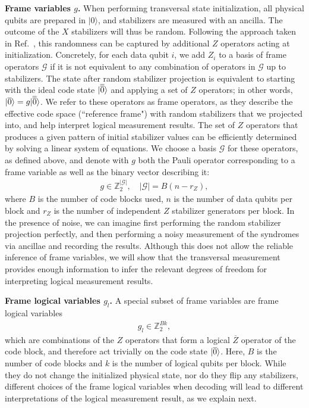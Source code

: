\textbf{Frame variables $g$.}
%
When performing transversal state initialization, all physical qubits are prepared in $|0\rangle$, and stabilizers are measured with an ancilla.
%
The outcome of the $X$ stabilizers will thus be random.
%
Following the approach taken in Ref.~\cite{gidney2021stim}, this randomness can be captured by additional $Z$ operators acting at initialization.
%
Concretely, for each data qubit $i$, we add $Z_i$ to a basis of frame operators $\mathcal{G}$ if it is not equivalent to any combination of operators in $\mathcal{G}$ up to stabilizers.
%
The state after random stabilizer projection is equivalent to starting with the ideal code state $|\overline{\overline{0}}\rangle$ and applying a set of $Z$ operators; in other words, $|\overline{0}\rangle=g|\overline{\overline{0}}\rangle$.
%
We refer to these operators as frame operators, as they describe the effective code space (``reference frame") with random stabilizers that we projected into, and help interpret logical measurement results.
%
The set of $Z$ operators that produces a given pattern of initial stabilizer values can be efficiently determined by solving a linear system of equations.
%
We choose a basis $\mathcal{G}$ for these operators, as defined above, and denote with $g$ both the Pauli operator corresponding to a frame variable as well as the binary vector describing it:
\begin{align}
g\in \mathbb{Z}_2^{|\mathcal{G}|}, \quad |\mathcal{G}|=B(n-r_Z),  
\end{align}
where $B$ is the number of code blocks used, $n$ is the number of data qubits per block and $r_Z$ is the number of independent $Z$ stabilizer generators per block.
%
In the presence of noise, we can imagine first performing the random stabilizer projection perfectly, and then performing a noisy measurement of the syndromes via ancillae and recording the results.
%
Although this does not allow the reliable inference of frame variables, we will show that the transversal measurement provides enough information to infer the relevant degrees of freedom for interpreting logical measurement results.

\textbf{Frame logical variables $g_l$.}
%
A special subset of frame variables are frame logical variables
\begin{align}
g_l\in\mathbb{Z}_2^{Bk},
\end{align}
which are combinations of the $Z$ operators that form a logical $\overline{Z}$ operator of the code block, and therefore act trivially on the code state $|{\overline{0}}\rangle$.
%
Here, $B$ is the number of code blocks and $k$ is the number of logical qubits per block.
%
While they do not change the initialized physical state, nor do they flip any stabilizers, different choices of the frame logical variables when decoding will lead to different interpretations of the logical measurement result, as we explain next.

